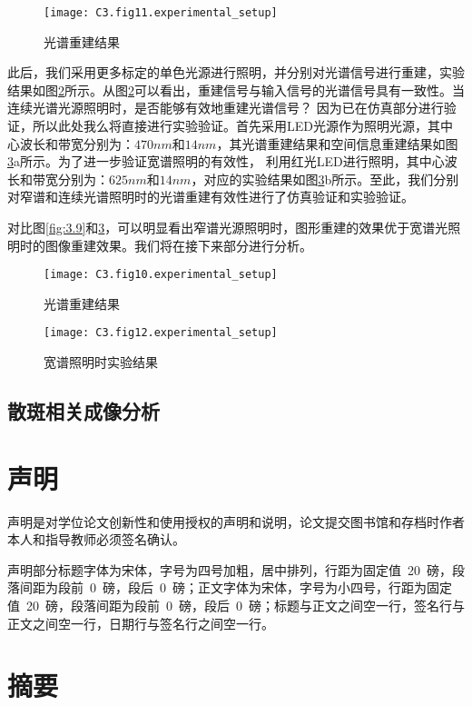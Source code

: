 \begin{figure}[htp]
	\centering
	\texttt{[image: C3.fig11.experimental\_setup]}
	\caption{光谱重建结果}
	\label{fig:3.10}
\end{figure}
此后，我们采用更多标定的单色光源进行照明，并分别对光谱信号进行重建，实验结果如图\ref{fig:3.11}所示。从图\ref{fig:3.11}可以看出，重建信号与输入信号的光谱信号具有一致性。当连续光谱光源照明时，是否能够有效地重建光谱信号？
因为已在仿真部分进行验证，所以此处我么将直接进行实验验证。首先采用LED光源作为照明光源，其中心波长和带宽分别为：$470nm$和$14nm$，其光谱重建结果和空间信息重建结果如图\ref{fig:3.12}a所示。为了进一步验证宽谱照明的有效性，
利用红光LED进行照明，其中心波长和带宽分别为：$625nm$和$14nm$，对应的实验结果如图\ref{fig:3.12}b所示。至此，我们分别对窄谱和连续光谱照明时的光谱重建有效性进行了仿真验证和实验验证。

对比图\ref{fig:3.9}和\ref{fig:3.12}，可以明显看出窄谱光源照明时，图形重建的效果优于宽谱光照明时的图像重建效果。我们将在接下来部分进行分析。

\begin{figure}[htp]
	\centering
	\texttt{[image: C3.fig10.experimental\_setup]}
	\caption{光谱重建结果}
	\label{fig:3.11}
\end{figure}
\begin{figure}[htp]
	\centering
	\texttt{[image: C3.fig12.experimental\_setup]}
	\caption{宽谱照明时实验结果}
	\label{fig:3.12}
\end{figure}

\subsection{散斑相关成像分析}


\section{声明}

声明是对学位论文创新性和使用授权的声明和说明，论文提交图书馆和存档时作者本人和指导教师必须签名确认。

声明部分标题字体为宋体，字号为四号加粗，居中排列，行距为固定值~20~磅，段落间距为段前~0~磅，段后~0~磅；正文字体为宋体，字号为小四号，行距为固定值~20~磅，段落间距为段前~0~磅，段后~0~磅；标题与正文之间空一行，签名行与正文之间空一行，日期行与签名行之间空一行。

\section{摘要}


